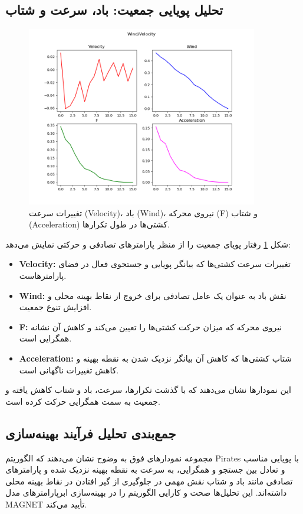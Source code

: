 \subsection{تحلیل پویایی جمعیت: باد، سرعت و شتاب}
\begin{figure}[h!]
    \centering
    \includegraphics[width=0.9\textwidth]{images/pirates_wind_velocity.png}
    \caption{تغییرات سرعت (Velocity)، باد (Wind)، نیروی محرکه (F) و شتاب (Acceleration) کشتی‌ها در طول تکرارها.}
    \label{fig:pirates_wind_velocity}
\end{figure}

شکل \ref{fig:pirates_wind_velocity} رفتار پویای جمعیت را از منظر پارامترهای تصادفی و حرکتی نمایش می‌دهد:
\begin{itemize}
    \item \textbf{Velocity:} تغییرات سرعت کشتی‌ها که بیانگر پویایی و جستجوی فعال در فضای پارامترهاست.
    \item \textbf{Wind:} نقش باد به عنوان یک عامل تصادفی برای خروج از نقاط بهینه محلی و افزایش تنوع جمعیت.
    \item \textbf{F:} نیروی محرکه که میزان حرکت کشتی‌ها را تعیین می‌کند و کاهش آن نشانه همگرایی است.
    \item \textbf{Acceleration:} شتاب کشتی‌ها که کاهش آن بیانگر نزدیک شدن به نقطه بهینه و کاهش تغییرات ناگهانی است.
\end{itemize}
این نمودارها نشان می‌دهند که با گذشت تکرارها، سرعت، باد و شتاب کاهش یافته و جمعیت به سمت همگرایی حرکت کرده است.

\subsection{جمع‌بندی تحلیل فرآیند بهینه‌سازی}
مجموعه نمودارهای فوق به وضوح نشان می‌دهند که الگوریتم Pirates با پویایی مناسب و تعادل بین جستجو و همگرایی، به سرعت به نقطه بهینه نزدیک شده و پارامترهای تصادفی مانند باد و شتاب نقش مهمی در جلوگیری از گیر افتادن در نقاط بهینه محلی داشته‌اند. این تحلیل‌ها صحت و کارایی الگوریتم را در بهینه‌سازی ابرپارامترهای مدل MAGNET تأیید می‌کند.


